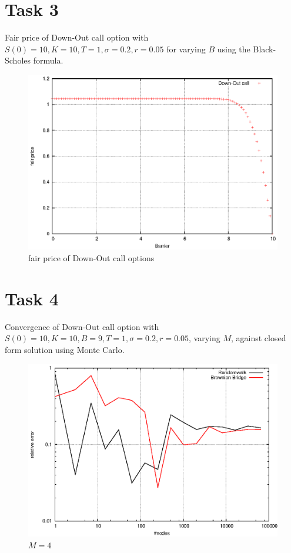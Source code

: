 \documentclass[]{article}
\begin{document}
\section*{Task 3}
Fair price of Down-Out call option with  $S(0)=10,K=10,T=1,\sigma=0.2,r=0.05$ for varying $B$ using the Black-Scholes formula.
\begin{figure}[!ht]
\centering
\includegraphics[width=.9\textwidth]{task3.eps}
\caption{fair price of Down-Out call options}
\label{fig:Task3}
\end{figure}
\clearpage


\section*{Task 4}
Convergence of Down-Out call option with $S(0)=10,K=10,B=9,T=1,\sigma=0.2,r=0.05$, varying $M$, against closed form solution using Monte Carlo.
\begin{figure}[!ht]
\centering
\includegraphics[width=.9\textwidth]{task4_mc_4.eps}
\caption{$M=4$}
\label{fig:Task4a}
\end{figure}
\end{document}
